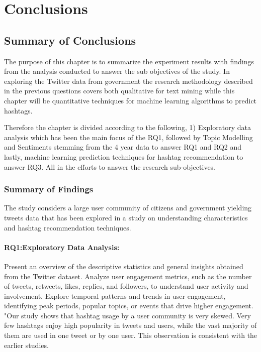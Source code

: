 \chapter{Conclusions}

\section{Summary of Conclusions}
\label{sec:conclusions:conclusion_summary}

The purpose of this chapter is to summarize the experiment results with findings from the analysis conducted to answer the sub objectives of the study.  In exploring the Twitter data from government the research methodology described in the previous questions covers both qualitative for text mining while this chapter will be quantitative techniques for machine learning algorithms to predict hashtags.

Therefore the chapter is divided according to the following, 1) Exploratory data analysis which has been the main focus of the RQ1, followed by Topic Modelling and Sentiments stemming from the 4 year data to answer RQ1 and RQ2 and lastly, machine learning prediction techniques for hashtag recommendation to answer RQ3.  All in the efforts to answer the research sub-objectives.

\subsection{Summary of Findings}

The study considers a large user community of citizens and government yielding tweets data that has been explored in a study on understanding characteristics and hashtag recommendation techniques. 

\subsubsection{RQ1:Exploratory Data Analysis:}
Present an overview of the descriptive statistics and general insights obtained from the Twitter dataset.
Analyze user engagement metrics, such as the number of tweets, retweets, likes, replies, and followers, to understand user activity and involvement.
Explore temporal patterns and trends in user engagement, identifying peak periods, popular topics, or events that drive higher engagement.\\

"Our study shows that hashtag usage by a user community is very skewed. Very few hashtags enjoy high popularity in tweets and users, while the vast majority of them are used in one tweet or by one user. This observation is consistent with the earlier studies.

